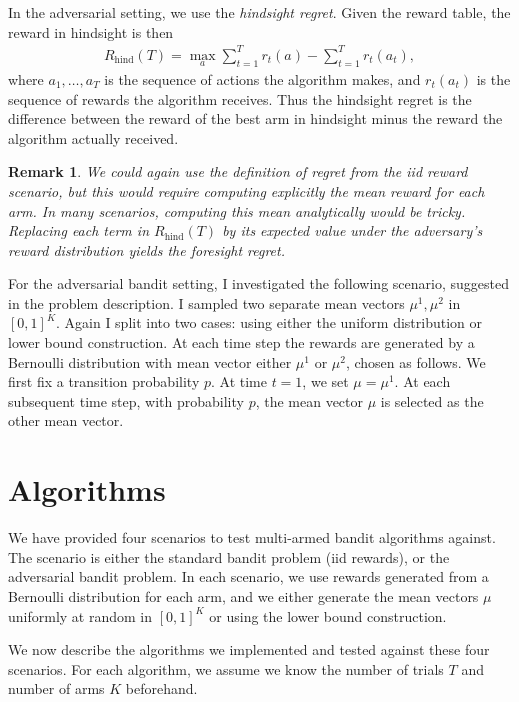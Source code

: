 \documentclass[10pt]{article}
\newtheorem{remark}{Remark}
\DeclareMathOperator{\hind}{hind}
\begin{document}
In the adversarial setting, we use the \emph{hindsight regret}. Given the reward
table, the reward in hindsight is then
\begin{align*}
    R_{\hind}(T) = \max_a \sum_{t=1}^T r_t(a) - \sum_{t=1}^T r_t(a_t),
\end{align*}
where $a_1, \ldots, a_T$ is the sequence of actions the algorithm makes, and
$r_t(a_t)$ is the sequence of rewards the algorithm receives. Thus the hindsight
regret is the difference between the reward of the best arm in hindsight minus
the reward the algorithm actually received.

\begin{remark}
    We could again use the definition of regret from the iid reward scenario, but
    this would require computing explicitly the mean reward for each arm. In
    many scenarios, computing this mean analytically would be tricky. Replacing
    each term in $R_{\hind}(T)$ by its expected value under the adversary's
    reward distribution yields the \emph{foresight regret}.
\end{remark}

For the adversarial bandit setting, I investigated the following scenario,
suggested in the problem description. I sampled two separate mean vectors
$\mu^1, \mu^2$ in $[0,1]^K$. Again I split into two cases: using either the
uniform distribution or lower bound construction. At each time step the rewards
are generated by a Bernoulli distribution with mean vector either $\mu^1$ or
$\mu^2$, chosen as follows. We first fix a transition probability $p$. At time
$t = 1$, we set $\mu = \mu^1$. At each subsequent time step, with probability
$p$, the mean vector $\mu$ is selected as the other mean vector.

\section{Algorithms}
We have provided four scenarios to test multi-armed bandit algorithms against.
The scenario is either the standard bandit problem (iid rewards), or the
adversarial bandit problem. In each scenario, we use rewards generated from a
Bernoulli distribution for each arm, and we either generate the mean vectors
$\mu$ uniformly at random in $[0,1]^K$ or using the lower bound construction.

We now describe the algorithms we implemented and tested against these four
scenarios. For each algorithm, we assume we know the number of trials $T$ and
number of arms $K$ beforehand.
\end{document}

